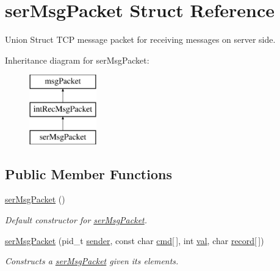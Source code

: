 \hypertarget{structserMsgPacket}{\section{ser\-Msg\-Packet Struct Reference}
\label{structserMsgPacket}
}


Union Struct T\-C\-P message packet for receiving messages on server side.  


Inheritance diagram for ser\-Msg\-Packet\-:\begin{figure}[H]
\begin{center}
\leavevmode
\includegraphics[height=3.000000cm]{structserMsgPacket}
\end{center}
\end{figure}
\subsection*{Public Member Functions}
\begin{DoxyCompactItemize}
\item 
\hypertarget{structserMsgPacket_a5b29522ee436c31160f86b4d73504069}{\hyperlink{structserMsgPacket_a5b29522ee436c31160f86b4d73504069}{ser\-Msg\-Packet} ()}\label{structserMsgPacket_a5b29522ee436c31160f86b4d73504069}

\begin{DoxyCompactList}\small\item\em Default constructor for \hyperlink{structserMsgPacket}{ser\-Msg\-Packet}. \end{DoxyCompactList}\item 
\hyperlink{structserMsgPacket_a19c1ff1a31f9adca56023d59fde6c428}{ser\-Msg\-Packet} (pid\-\_\-t \hyperlink{structmsgPacket_a294c1f456116eb9177b31ab8b5577f86}{sender}, const char \hyperlink{structmsgPacket_a8b49c124b4ca2ed872692333b71d74fd}{cmd}\mbox{[}$\,$\mbox{]}, int \hyperlink{structintRecMsgPacket_a09009e50e4f452b7fea038fcb5f8e382}{val}, char \hyperlink{structintRecMsgPacket_a4edab3e169d3d5d2ceced40d663e8055}{record}\mbox{[}$\,$\mbox{]})
\begin{DoxyCompactList}\small\item\em Constructs a \hyperlink{structserMsgPacket}{ser\-Msg\-Packet} given its elements. \end{DoxyCompactList}\end{DoxyCompactItemize}
